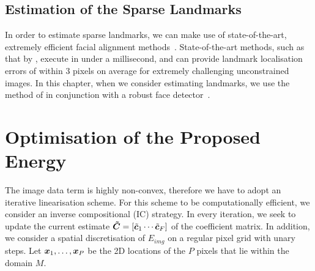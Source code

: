 \subsection{Estimation of the Sparse Landmarks}
In order to estimate sparse landmarks, we can make use of state-of-the-art, extremely
efficient facial alignment methods~\cite{kazemi2014one,asthana2014incremental,%
menpo14,alabort2014bayesian}.
State-of-the-art methods, such as that by \citet{kazemi2014one},
execute in under a millisecond, and can provide landmark localisation errors
of within $3$ pixels on average for extremely challenging unconstrained images.
In this chapter, when we consider estimating landmarks, we use the method of 
\citet{kazemi2014one} in conjunction with a robust face detector~\cite{zafeiriou2015survey}.
\section{Optimisation of the Proposed Energy}
The image data term is highly non-convex, therefore we have to adopt an iterative
linearisation scheme. For this scheme to be computationally efficient, we consider
an inverse compositional (IC) strategy. In every iteration, we seek to update the
current estimate $\boldsymbol{\tilde{C}}= [\tilde{\boldsymbol{c}}_1 \cdots \tilde{\boldsymbol{c}}_F]$ of the
coefficient matrix. In addition, we consider a spatial discretisation of $E_{img}$ 
on a regular pixel grid with unary steps. Let $\boldsymbol{x}_1,\ldots,\boldsymbol{x}_P$ be the 2D 
locations of the $P$ pixels that lie within the domain $M$.

